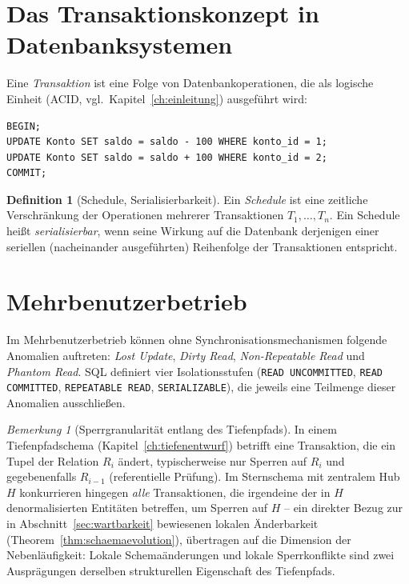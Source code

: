 ﻿\documentclass[a4paper,12pt]{report}
\theoremstyle{definition}
\newtheorem{definition}{Definition}[chapter]
\theoremstyle{remark}
\newtheorem{remark}{Bemerkung}[chapter]
\begin{document}
\section{Das Transaktionskonzept in Datenbanksystemen}

Eine \emph{Transaktion} ist eine Folge von Datenbankoperationen, die als
logische Einheit (ACID, vgl.\ Kapitel~\ref{ch:einleitung}) ausgeführt
wird:

\begin{lstlisting}
BEGIN;
UPDATE Konto SET saldo = saldo - 100 WHERE konto_id = 1;
UPDATE Konto SET saldo = saldo + 100 WHERE konto_id = 2;
COMMIT;
\end{lstlisting}

\begin{definition}[Schedule, Serialisierbarkeit]
Ein \emph{Schedule} ist eine zeitliche Verschränkung der Operationen
mehrerer Transaktionen $T_1,\ldots,T_n$. Ein Schedule heißt
\emph{serialisierbar}, wenn seine Wirkung auf die Datenbank derjenigen
einer seriellen (nacheinander ausgeführten) Reihenfolge der
Transaktionen entspricht.
\end{definition}

\section{Mehrbenutzerbetrieb}

Im Mehrbenutzerbetrieb können ohne Synchronisationsmechanismen folgende
Anomalien auftreten: \emph{Lost Update}, \emph{Dirty Read},
\emph{Non-Repeatable Read} und \emph{Phantom Read}. SQL definiert vier
Isolationsstufen (\texttt{READ UNCOMMITTED}, \texttt{READ COMMITTED},
\texttt{REPEATABLE READ}, \texttt{SERIALIZABLE}), die jeweils eine
Teilmenge dieser Anomalien ausschließen.

\begin{remark}[Sperrgranularität entlang des Tiefenpfads]
\label{rem:sperren}
In einem Tiefenpfadschema (Kapitel~\ref{ch:tiefenentwurf}) betrifft eine
Transaktion, die ein Tupel der Relation $R_i$ ändert, typischerweise nur
Sperren auf $R_i$ und gegebenenfalls $R_{i-1}$ (referentielle
Prüfung). Im Sternschema mit zentralem Hub $H$ konkurrieren hingegen
\emph{alle} Transaktionen, die irgendeine der in $H$ denormalisierten
Entitäten betreffen, um Sperren auf $H$ -- ein direkter Bezug zur in
Abschnitt~\ref{sec:wartbarkeit} bewiesenen lokalen Änderbarkeit
(Theorem~\ref{thm:schaemaevolution}), übertragen auf die Dimension der
Nebenläufigkeit: Lokale Schemaänderungen und lokale Sperrkonflikte sind
zwei Ausprägungen derselben strukturellen Eigenschaft des
Tiefenpfads.
\end{remark}
\end{document}
